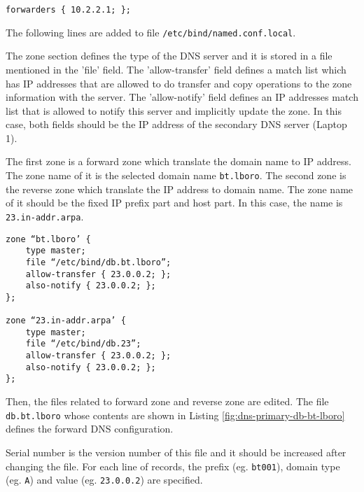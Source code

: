 \begin{lstlisting}
forwarders { 10.2.2.1; };
\end{lstlisting}



The following lines are added to file \texttt{/etc/bind/named.conf.local}.

The zone section defines the type of the DNS server and it is stored in a file mentioned in the 'file' field. 
The 'allow-transfer' field defines a match list which has IP addresses that are allowed to do transfer and copy operations to the zone information with the server. 
The 'allow-notify' field defines an IP addresses match list that is allowed to notify this server and implicitly update the zone.
In this case, both fields should be the IP address of the secondary DNS server (Laptop 1).

The first zone is a forward zone which translate the domain name to IP address. The zone name of it is the selected domain name \texttt{bt.lboro}. 
The second zone is the reverse zone which translate the IP address to domain name. The zone name of it should be the fixed IP prefix part and host part. In this case, the name is \texttt{23.in-addr.arpa}.


\begin{lstlisting}
zone “bt.lboro’ {
	type master;
	file “/etc/bind/db.bt.lboro”;
	allow-transfer { 23.0.0.2; };
	also-notify { 23.0.0.2; };
};

zone “23.in-addr.arpa’ {
	type master;
	file “/etc/bind/db.23”;
	allow-transfer { 23.0.0.2; };
	also-notify { 23.0.0.2; };
};
\end{lstlisting}

Then, the files related to forward zone and reverse zone are edited. 
The file \texttt{db.bt.lboro} whose contents are shown in Listing \ref{fig:dns-primary-db-bt-lboro} defines the forward DNS configuration.




Serial number is the version number of this file and it should be increased after changing the file. 
For each line of records, the prefix (eg. \texttt{bt001}), domain type (eg. \texttt{A}) and value (eg. \texttt{23.0.0.2}) are specified.





